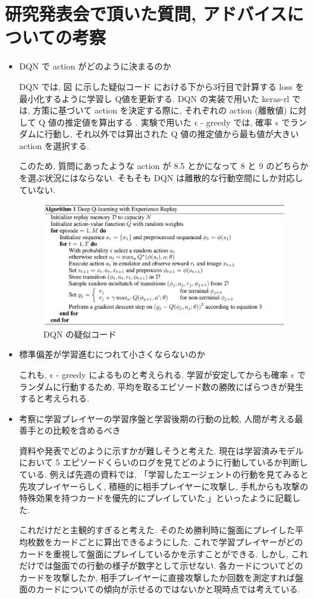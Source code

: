 \documentclass{jarticle}     %
\begin{document}
\section{研究発表会で頂いた質問, アドバイスについての考察}
\begin{itemize}
  \item DQN で action がどのように決まるのか
  \par
  DQN では, 図 に示した疑似コード \cite{DQN} における下から3行目で計算する loss を最小化するように学習し Q値を更新する.
  DQN の実装で用いた keras-rl では, 方策に基づいて action を決定する際に, それぞれの action (離散値) に対して Q 値の推定値を算出する \cite{keras-rl} .
  実験で用いた $\mathrm{\epsilon}$ - greedy では, 確率 $\mathrm{\epsilon}$ でランダムに行動し, それ以外では算出された Q 値の推定値から最も値が大きい action を選択する.
  \par
  このため, 質問にあったような action が 8.5 とかになって 8 と 9 のどちらかを選ぶ状況にはならない. そもそも DQN は離散的な行動空間にしか対応していない.
  \begin{figure}[h]
    \centering
    \includegraphics[width=120mm]{assets/DQNalgo.eps}
    \caption{DQN の疑似コード \cite{DQN}}
    \label{fig:result4}
  \end{figure}

  \item 標準偏差が学習進むにつれて小さくならないのか
  \par
  これも, $\mathrm{\epsilon}$ - greedy によるものと考えられる. 学習が安定してからも確率 $\mathrm{\epsilon}$ でランダムに行動するため, 平均を取るエピソード数の勝敗にばらつきが発生すると考えられる.

  \item 考察に学習プレイヤーの学習序盤と学習後期の行動の比較, 人間が考える最善手との比較を含めるべき
  \par
  資料や発表でどのように示すかが難しそうと考えた. 現在は学習済みモデルにおいて 5 エピソードくらいのログを見てどのように行動しているか判断している. 例えば先週の資料では, 「学習したエージェントの行動を見てみると先攻プレイヤーらしく, 積極的に相手プレイヤーに攻撃し, 手札からも攻撃の特殊効果を持つカードを優先的にプレイしていた.」といったように記載した. 
  \par 
  これだけだと主観的すぎると考えた. そのため勝利時に盤面にプレイした平均枚数をカードごとに算出できるようにした. これで学習プレイヤーがどのカードを重視して盤面にプレイしているかを示すことができる. 
  しかし, これだけでは盤面での行動の様子が数字として示せない. 各カードについてどのカードを攻撃したか, 相手プレイヤーに直接攻撃したか回数を測定すれば盤面のカードについての傾向が示せるのではないかと現時点では考えている. 


\end{itemize}
\end{document}
